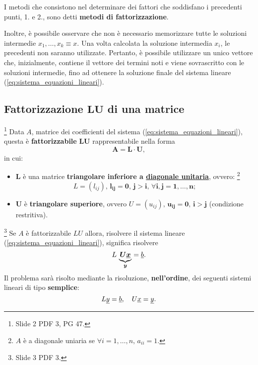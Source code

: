 I metodi che consistono nel determinare dei fattori che soddisfano i precedenti punti, 1. e 2., sono detti \textbf{metodi di fattorizzazione}.

Inoltre, è possibile osservare che non è necessario memorizzare tutte le soluzioni intermedie $x_1,\hdots, x_k\equiv x$. Una volta calcolata la soluzione intermedia $x_i$, le precedenti non saranno utilizzate. Pertanto, è possibile utilizzare un unico vettore che, inizialmente, contiene il vettore dei termini noti e viene sovrascritto con le soluzioni intermedie, fino ad ottenere la soluzione finale del sistema lineare (\ref{eq:sistema_equazioni_lineari}).

\subsection{Fattorizzazione \texorpdfstring{$\boldsymbol{LU}$}{LU} di una matrice}
\begin{definition}\footnote{Slide 2 PDF 3, PG 47.}
    Data $A$, matrice dei coefficienti del sistema (\ref{eq:sistema_equazioni_lineari}), questa è \textbf{fattorizzabile} $\boldsymbol{LU}$ rappresentabile nella forma
    \begin{equation}\label{eq:ALU}
        \boldsymbol{A=L\cdot U},
    \end{equation}
    in cui:
    \begin{itemize}
        \item $\boldsymbol L$ è una matrice \textbf{triangolare inferiore a \ul{diagonale unitaria}}, ovvero: \footnote{$A$ è a diagonale uniaria se $\forall i=1,\hdots, n,\, a_{ii}=1$.}
        \begin{equation*}
            L=(l_{ij}),\, \boldsymbol{l_{ij}=0,\, j>i,\, \forall i,j=1,\hdots, n};
        \end{equation*}
        \item $\boldsymbol U$ è \textbf{triangolare superiore}, ovvero $U=(u_{ij}),\, \boldsymbol{u_{ij}=0,\, i>j}$ (condizione restritiva).
    \end{itemize}
\end{definition}

\begin{remark}\footnote{Slide 3 PDF 3.}
    Se $A$ è fattorizzabile $LU$ allora, risolvere il sistema lineare (\ref{eq:sistema_equazioni_lineari}), significa risolvere
    \begin{equation*}
        L\, \underbrace{\boldsymbol{U\uline x}}_{\boldsymbol y}= \uline b.
    \end{equation*}
    Il problema sarà risolto mediante la risoluzione, \textbf{nell'ordine}, dei seguenti sistemi lineari di tipo \textbf{semplice}:
    \begin{equation*}
        L\uline y =\uline b,\quad U\uline x= \uline y.
    \end{equation*}
\end{remark}

